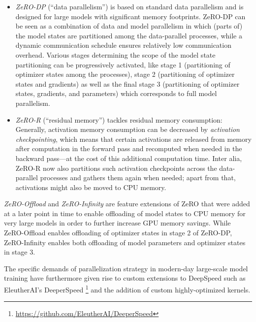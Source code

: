 \begin{itemize}
    \item \textit{ZeRO-DP} (\enquote{data parallelism}) is based on standard
          data parallelism and is designed for large models with significant
          memory footprints. ZeRO-DP can be seen as a combination of data and model
          parallelism in which (parts of) the model states are partitioned
          among the data-parallel processes, while a dynamic communication
          schedule ensures relatively low communication overhead. Various stages
          determining the scope of the model state partitioning can be progressively
          activated, like stage 1 (partitioning of optimizer states among the processes), 
          stage 2 (partitioning of optimizer states and gradients) as well as 
          the final stage 3 (partitioning of optimizer states, gradients, and 
          parameters) which corresponds to full model parallelism.
    \item \textit{ZeRO-R} (\enquote{residual memory}) tackles residual memory consumption: 
          Generally, activation memory consumption can be decreased by 
          \textit{activation checkpointing}, which means that certain activations
          are released from memory after computation in the forward pass and
          recomputed when needed in the backward pass---at the cost of this additional
          computation time. Inter alia, ZeRO-R now also partitions such activation 
          checkpoints across the data-parallel processes and gathers them again when 
          needed; apart from that, activations might also be moved to CPU memory. 
\end{itemize}

\textit{ZeRO-Offload} \cite{DBLP:journals/corr/abs-2101-06840} and 
\textit{ZeRO-Infinity} \cite{DBLP:journals/corr/abs-2104-07857} are feature extensions of ZeRO
that were added at a later point in time to enable offloading of model states to CPU memory 
for very large models in order to further increase GPU memory savings. While ZeRO-Offload 
enables offloading of optimizer states in stage 2 of ZeRO-DP, ZeRO-Infinity
enables both offloading of model parameters and optimizer states in stage 3. 

The specific demands of parallelization strategy in modern-day large-scale model training 
have furthermore given rise to custom extensions to DeepSpeed such as EleutherAI's DeeperSpeed
\footnote{\url{https://github.com/EleutherAI/DeeperSpeed}} and the addition of custom 
highly-optimized kernels.